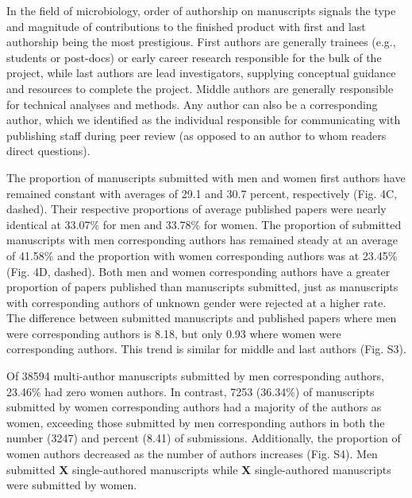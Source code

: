 \documentclass[11pt,]{article}
\begin{document}
In the field of microbiology, order of authorship on manuscripts signals
the type and magnitude of contributions to the finished product with
first and last authorship being the most prestigious. First authors are
generally trainees (e.g., students or post-docs) or early career
research responsible for the bulk of the project, while last authors are
lead investigators, supplying conceptual guidance and resources to
complete the project. Middle authors are generally responsible for
technical analyses and methods. Any author can also be a corresponding
author, which we identified as the individual responsible for
communicating with publishing staff during peer review (as opposed to an
author to whom readers direct questions).

The proportion of manuscripts submitted with men and women first authors
have remained constant with averages of 29.1 and 30.7 percent,
respectively (Fig. 4C, dashed). Their respective proportions of average
published papers were nearly identical at 33.07\% for men and 33.78\%
for women. The proportion of submitted manuscripts with men
corresponding authors has remained steady at an average of 41.58\% and
the proportion with women corresponding authors was at 23.45\% (Fig. 4D,
dashed). Both men and women corresponding authors have a greater
proportion of papers published than manuscripts submitted, just as
manuscripts with corresponding authors of unknown gender were rejected
at a higher rate. The difference between submitted manuscripts and
published papers where men were corresponding authors is 8.18, but only
0.93 where women were corresponding authors. This trend is similar for
middle and last authors (Fig. S3).

Of 38594 multi-author manuscripts submitted by men corresponding
authors, 23.46\% had zero women authors. In contrast, 7253 (36.34\%) of
manuscripts submitted by women corresponding authors had a majority of
the authors as women, exceeding those submitted by men corresponding
authors in both the number (3247) and percent (8.41) of submissions.
Additionally, the proportion of women authors decreased as the number of
authors increases (Fig. S4). Men submitted \textbf{X} single-authored
manuscripts while \textbf{X} single-authored manuscripts were submitted
by women.
\end{document}
